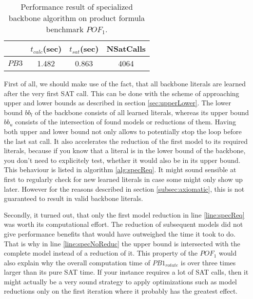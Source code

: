 \begin{table}[h]
\centering
\begin{tabular}{l| c c c }
&	$t_{calc}$(sec) &	$t_{sat}$(sec)	& NSatCalls \\
\hline
$PB3$ & 1.482 & 0.863 & 4064 \\
\end{tabular}
\caption[Performance result of specialized backbone algorithm]{Performance result of specialized backbone algorithm on product formula benchmark $POF_1$.}
\label{tab:thoreSpecialResults}
\end{table}

First of all, we should make use of the fact, that all backbone literals are learned after the very first SAT call. This can be done with the scheme of approaching upper and lower bounds as described in section \ref{sec:upperLower}. The lower bound $bb_l$ of the backbone consists of all learned literals, whereas its upper bound $bb_u$ consists of the intersection of found models or reductions of them. Having both upper and lower bound not only allows to potentially stop the loop before the last sat call. It also accelerates the reduction of the first model to its required literals, because if you know that a literal is in the lower bound of the backbone, you don't need to explicitely test, whether it would also be in its upper bound. This behaviour is listed in algorithm \ref{alg:specReq}. It might sound sensible at first to regularly check for new learned literals in case some might only show up later. However for the reasons described in section \ref{subsec:axiomatic}, this is not guaranteed to result in valid backbone literals.

Secondly, it turned out, that only the first model reduction in line \ref{line:specReq} was worth its computational effort. The reduction of subsequent models did not give performance benefits that would have outweighed the time it took to do. That is why in line \ref{line:specNoReduc} the upper bound is intersected with the complete model instead of a reduction of it. This property of the $POF_1$ would also explain why the overall computation time of $PB1_{rotate}$ is over three times larger than its pure SAT time. If your instance requires a lot of SAT calls, then it might actually be a very sound strategy to apply optimizations such as model reductions only on the first iteration where it probably has the greatest effect. 

